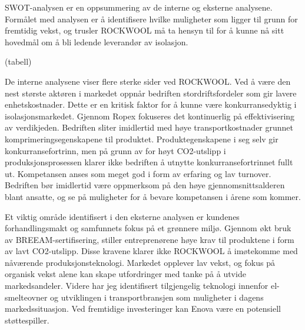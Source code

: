SWOT-analysen er en oppsummering av de interne og eksterne analysene. Formålet med analysen er å identifisere hvilke muligheter som ligger til grunn for fremtidig vekst, og trusler ROCKWOOL må ta hensyn til for å kunne nå sitt hovedmål om å bli ledende leverandør av isolasjon.

\indent \newline
(tabell)

\indent \newline
De interne analysene viser flere sterke sider ved ROCKWOOL. Ved å være den nest største aktøren i markedet oppnår bedriften stordriftsfordeler som gir lavere enhetskostnader. Dette er en kritisk faktor for å kunne være konkurransedyktig i isolasjonsmarkedet. Gjennom Ropex fokuseres det kontinuerlig på effektivisering av verdikjeden. Bedriften sliter imidlertid med høye transportkostnader grunnet komprimeringsegenskapene til produktet. Produktegenskapene i seg selv gir konkurransefortrinn, men på grunn av for høyt CO2-utslipp i produksjonsprosessen klarer ikke bedriften å utnytte konkurransefortrinnet fullt ut. Kompetansen anses som meget god i form av erfaring og lav turnover. Bedriften bør imidlertid være oppmerksom på den høye gjennomsnittsalderen blant ansatte, og se på muligheter for å bevare kompetansen i årene som kommer.

\indent \newline
Et viktig område identifisert i den eksterne analysen er kundenes forhandlingsmakt og samfunnets fokus på et grønnere miljø. Gjennom økt bruk av BREEAM-sertifisering, stiller entreprenørene høye krav til produktene i form av lavt CO2-utslipp. Disse kravene klarer ikke ROCKWOOL å imøtekomme med nåværende produksjonsteknologi. Markedet opplever lav vekst, og fokus på organisk vekst alene kan skape utfordringer med tanke på å utvide markedsandeler. Videre har jeg identifisert tilgjengelig teknologi innenfor el-smelteovner og utviklingen i transportbransjen som muligheter i dagens markedssituasjon. Ved fremtidige investeringer kan Enova være en potensiell støttespiller.